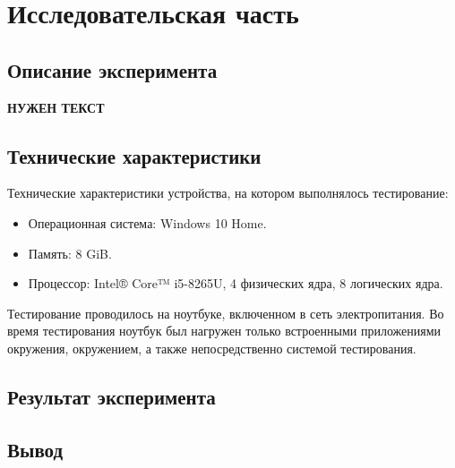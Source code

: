\chapter{Исследовательская часть}

\section{Описание эксперимента}

\textbf{НУЖЕН ТЕКСТ}

\section{Технические характеристики}

Технические характеристики устройства, на котором выполнялось тестирование:

\begin{itemize}
	\item Операционная система: Windows 10 Home\cite{win}.
	\item Память: 8 GiB.
    \item Процессор: Intel® Core™ i5-8265U, 4 физических ядра, 8 логических
        ядра\cite{intel}.
\end{itemize}

Тестирование проводилось на ноутбуке, включенном в сеть электропитания. Во
время тестирования ноутбук был нагружен только встроенными приложениями
окружения, окружением, а также непосредственно системой тестирования.

\section{Результат эксперимента}


\section*{Вывод}
